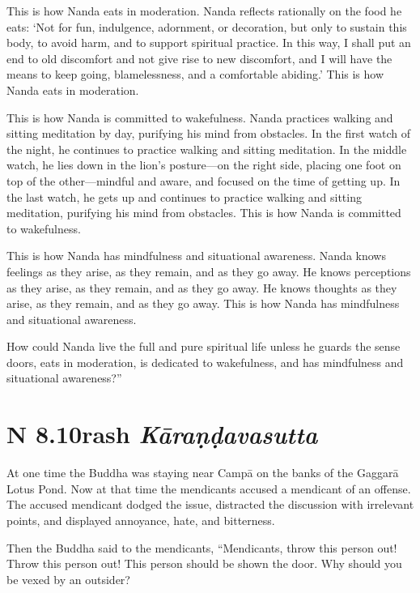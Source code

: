 \documentclass[12pt,openany]{book}%
\newcommand*{\suttatitleacronym}[1]{\smaller[2]{#1}\vspace*{.3em}}
\newcommand*{\suttatitletranslation}[1]{\linebreak{#1}}
\newcommand*{\suttatitleroot}[1]{\linebreak\smaller[2]\itshape{#1}}
\newcommand*{\tocacronym}[1]{\hspace*{-3.3em}{#1}\quad}
\newcommand*{\toctranslation}[1]{#1}
\newcommand*{\tocroot}[1]{(\textit{#1})}
\begin{document}
This is how Nanda eats in moderation. Nanda reflects rationally on the food he eats: ‘Not for fun, indulgence, adornment, or decoration, but only to sustain this body, to avoid harm, and to support spiritual practice. In this way, I shall put an end to old discomfort and not give rise to new discomfort, and I will have the means to keep going, blamelessness, and a comfortable abiding.’ This is how Nanda eats in moderation. 

This is how Nanda is committed to wakefulness. Nanda practices walking and sitting meditation by day, purifying his mind from obstacles. In the first watch of the night, he continues to practice walking and sitting meditation. In the middle watch, he lies down in the lion’s posture—on the right side, placing one foot on top of the other—mindful and aware, and focused on the time of getting up. In the last watch, he gets up and continues to practice walking and sitting meditation, purifying his mind from obstacles. This is how Nanda is committed to wakefulness. 

This is how Nanda has mindfulness and situational awareness. Nanda knows feelings as they arise, as they remain, and as they go away. He knows perceptions as they arise, as they remain, and as they go away. He knows thoughts as they arise, as they remain, and as they go away. This is how Nanda has mindfulness and situational awareness. 

How could Nanda live the full and pure spiritual life unless he guards the sense doors, eats in moderation, is dedicated to wakefulness, and has mindfulness and situational awareness?” 

%
\section*{{\suttatitleacronym AN 8.10}{\suttatitletranslation Trash }{\suttatitleroot Kāraṇḍavasutta}}
\addcontentsline{toc}{section}{\tocacronym{AN 8.10} \toctranslation{Trash } \tocroot{Kāraṇḍavasutta}}

At one time the Buddha was staying near \textsanskrit{Campā} on the banks of the \textsanskrit{Gaggarā} Lotus Pond. Now at that time the mendicants accused a mendicant of an offense. The accused mendicant dodged the issue, distracted the discussion with irrelevant points, and displayed annoyance, hate, and bitterness. 

Then the Buddha said to the mendicants, “Mendicants, throw this person out! Throw this person out! This person should be shown the door. Why should you be vexed by an outsider? 
\end{document}
